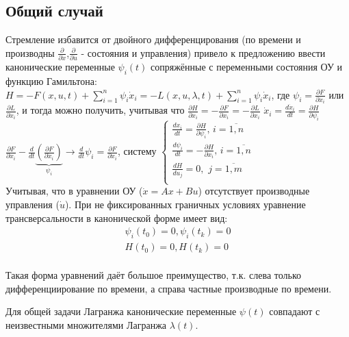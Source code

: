 \documentclass[preprint,russian,a5paper,10pt,twoside,mediummath]{ncc}
\begin{document}
\subsection{Общий случай\label{variations:Canonical_Euler}}
Стремление избавится от двойного дифференцирования (по времени и производны  $\frac{\partial }{\partial \dot{x}}$,$\frac{\partial }{\partial \dot{u}}$ - состояния и управления) привело к предложению ввести канонические переменные ${{\psi }_{i}}\left( t \right)$ сопряжённые с переменными состояния ОУ и функцию Гамильтона: $H=-F\left( x,u,t \right)+\sum\limits_{i=1}^{n}{{{\psi }_{i}}{{{\dot{x}}}_{i}}}=-L\left( x,u,\lambda ,t \right)+\sum\limits_{i=1}^{n}{{{\psi }_{i}}{{{\dot{x}}}_{i}}}$, где ${{\psi }_{i}}=\frac{\partial F}{\partial {{{\dot{x}}}_{i}}}$ или $\frac{\partial L}{\partial {{{\dot{x}}}_{i}}}$, и тогда можно получить, учитывая что $\frac{\partial H}{\partial {{x}_{i}}}=-\frac{\partial F}{\partial {{x}_{i}}}=-\frac{\partial L}{\partial {{x}_{i}}}$ ${{\dot{x}}_{i}}=\frac{d{{{\dot{x}}}_{i}}}{dt}=\frac{\partial H}{\partial {{\psi }_{i}}}$ $\frac{\partial F}{\partial {{x}_{i}}}-\frac{d}{dt}\underbrace{\left( \frac{\partial F}{\partial {{{\dot{x}}}_{i}}} \right)}_{{{\psi }_{i}}}\to \frac{d}{dt}{{\psi }_{i}}=\frac{\partial F}{\partial {{x}_{i}}}$, систему
$\left\{ \begin{array}{*{35}{l}}
   \frac{d{{x}_{i}}}{dt}=\frac{\partial H}{\partial {{\psi }_{i}}},\,i=\overline{1,n}  \\
   \frac{d{{\psi }_{i}}}{dt}=-\frac{\partial H}{\partial {{x}_{i}}},\,i=\overline{1,n}  \\
   \frac{dH}{d{{u}_{j}}}=0,\,\,j=\overline{1,m}  \\
\end{array} \right.$
\\Учитывая, что в уравнении ОУ ($\dot{x}=Ax+Bu$) отсутствует производные управления ($\dot{u}$). При не фиксированных граничных условиях уравнение трансверсальности в канонической форме имеет вид: 
\[\begin{array}{*{35}{l}}
   {{\psi }_{i}}\left( {{t}_{0}} \right)=0,{{\psi }_{i}}\left( {{t}_{k}} \right)=0  \\
   H\left( {{t}_{0}} \right)=0,H\left( {{t}_{k}} \right)=0  \\
\end{array}\]
\par Такая форма уравнений даёт большое преимущество, т.к. слева только дифференциирование по времени, а справа частные производные по времени.
\par Для общей задачи Лагранжа канонические переменные $\psi \left( t \right)$ совпадают с неизвестными множителями Лагранжа $\lambda \left( t \right)$.
\end{document}
